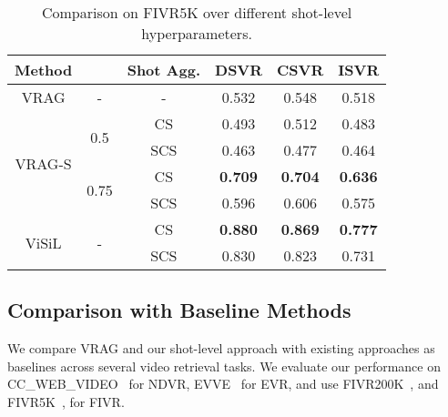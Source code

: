 \documentclass[letterpaper]{article} \usepackage{aaai22}  \usepackage{times}  \usepackage{helvet}  \usepackage{courier}  \usepackage[hyphens]{url}  \usepackage{graphicx} \urlstyle{rm} \usepackage{amsmath}
\begin{document}
\begin{table}[ht]
    \centering
    \begin{tabular}{|c|c|c|c|c|c|}
    \hline
         Method &  & Shot Agg. & DSVR & CSVR & ISVR \\  
         \hline\hline
         VRAG & - & - & 0.532 & 0.548 & 0.518 \\
         \hline \hline
\multirow{4}{*}{VRAG-S} & \multirow{2}{*}{0.5} & CS & 0.493 & 0.512 & 0.483 \\
          \cline{3-6}
         && SCS & 0.463 & 0.477 & 0.464 \\
          \cline{2-6}
& \multirow{2}{*}{0.75} & CS & \textbf{0.709} & \textbf{0.704} & \textbf{0.636} \\
         \cline{3-6}
        & & SCS & 0.596 & 0.606 & 0.575 \\
         \hline \hline 
         \multirow{2}{*}{ViSiL} & \multirow{2}{*}{-} & CS & \textbf{0.880} & \textbf{0.869} & \textbf{0.777} \\
         \cline{3-6}
         & & SCS & 0.830 & 0.823 & 0.731 \\
         \hline \hline
    \end{tabular}
    \caption{Comparison on FIVR5K over different shot-level hyperparameters.}
    \label{tab:ablation:shot-level}
\end{table}

\subsection{Comparison with Baseline Methods}

We compare VRAG and our shot-level approach with existing approaches as baselines across several video retrieval tasks. We evaluate our performance on CC\_WEB\_VIDEO~\cite{dataset:cc-web-video} for NDVR, EVVE~\cite{dataset:evve} for EVR, and use FIVR200K~\cite{dataset:fivr200k}, and FIVR5K~\cite{kordopatiszilos2019visil, dataset:fivr200k}, for FIVR.
\vspace{0mm}
\end{document}
